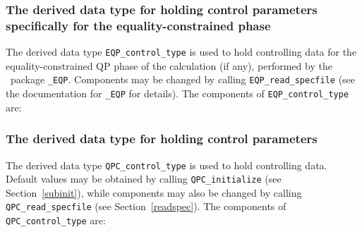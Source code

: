\documentclass{galahad}
\newcommand{\packagename}{QPC}
\begin{document}

\subsubsection{The derived data type for holding control 
 parameters specifically for the equality-constrained phase}\label{typeeqpcontrol}
The derived data type 
{\tt EQP\_control\_type} 
is used to hold controlling data for the equality-constrained QP
phase of the calculation (if any),
performed by the \libraryname\ package {\tt \libraryname\_EQP}. 
Components may be changed by calling 
{\tt EQP\_read\-\_specfile}
(see the documentation for {\tt \libraryname\_EQP}
for details). The components of 
{\tt EQP\_control\_type} 
are:




\subsubsection{The derived data type for holding control 
 parameters}\label{typecontrol}
The derived data type 
{\tt \packagename\_control\_type} 
is used to hold controlling data. Default values may be obtained by calling 
{\tt \packagename\_initialize}
(see Section~\ref{subinit}),
while components may also be changed by calling 
{\tt \packagename\_read\-\_specfile}
(see Section~\ref{readspec}). 
The components of 
{\tt \packagename\_control\_type} 
are:
\end{document}
